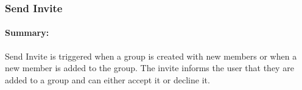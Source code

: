 \documentclass[11pt]{article}
\begin{document}
 

\subsubsection{Send Invite} \label{UC-send-invite}
\paragraph{Summary:} Send Invite is triggered when a group is created with new members or when a new member is added to the group. The invite informs the user that they are added to a group and can either accept it or decline it.
\end{document}

